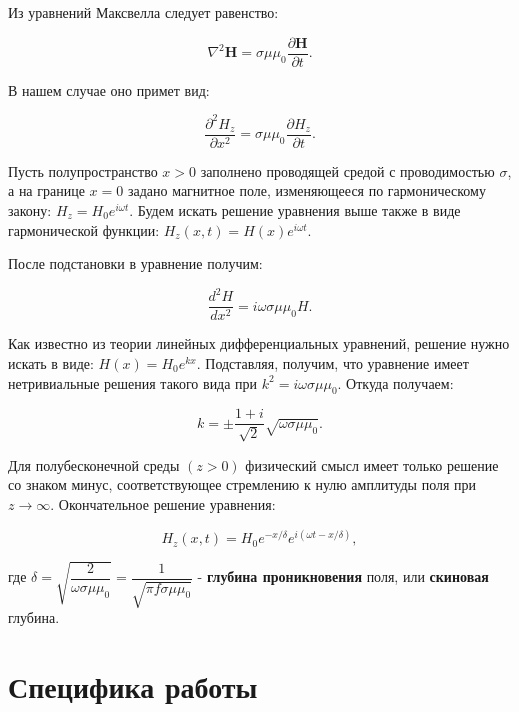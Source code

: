\documentclass[a4paper, 12pt]{article} %
\begin{document}
	
	\noindent Из уравнений Максвелла следует равенство:
	
	\begin{equation}
		\nabla^2\boldsymbol{H} = \sigma\mu\mu_0\dfrac{\partial\boldsymbol{H}}{\partial t}.
	\end{equation}
	
	\noindent В нашем случае оно примет вид:
	
	\begin{equation}
		\dfrac{\partial^2 H_z}{\partial x^2} = \sigma\mu\mu_0 \dfrac{\partial H_z}{\partial t}.
	\end{equation} 

	\noindent Пусть полупространство $x > 0$ заполнено проводящей средой с проводимостью $\sigma$, а на границе $x = 0$ задано магнитное поле, изменяющееся по гармоническому закону: $H_z = H_0 e^{i\omega t}$. Будем искать решение уравнения выше также в виде гармонической функции: $H_z(x, t) = H(x)e^{i\omega t}$.
	
	\noindent После подстановки в уравнение получим:
	
	\begin{equation}
		\dfrac{d^2 H}{dx^2} = i\omega\sigma\mu\mu_0H.
		\label{H_diff}
	\end{equation}

	\noindent Как известно из теории линейных дифференциальных уравнений,
	решение нужно искать в виде: $H(x) = H_0 e^{k x}$. Подставляя, получим,
	что уравнение имеет нетривиальные решения такого вида при $k^2 = i\omega\sigma\mu\mu_0$. Откуда получаем:
	
	\begin{equation}
		k = \pm \dfrac{1+i}{\sqrt{2}}\sqrt{\omega\sigma\mu\mu_0}.
	\end{equation}

	\noindent Для полубесконечной среды $(z > 0)$ физический смысл имеет только решение со знаком минус, соответствующее стремлению к нулю амплитуды поля при $z \rightarrow \infty$. Окончательное решение уравнения:
	
	\begin{equation}
		H_z(x, t) = H_0e^{-x/\delta}e^{i(\omega t - x/\delta)},
	\end{equation}

	\noindent где $\delta = \sqrt{\dfrac{2}{\omega\sigma\mu\mu_0}} = \dfrac{1}{\sqrt{\pi f \sigma\mu\mu_0}}$ - \textbf{глубина проникновения} поля, или \textbf{скиновая} глубина.
	


\section{Специфика работы}
\end{document}

